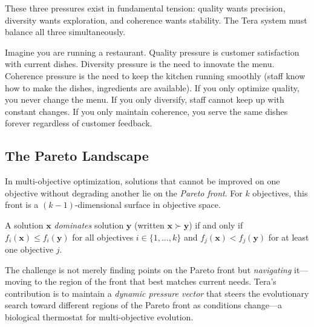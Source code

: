 These three pressures exist in fundamental tension: quality wants precision, diversity wants exploration, and coherence wants stability. The Tera system must balance all three simultaneously.

\begin{example}
\label{ex:restaurant}
Imagine you are running a restaurant. Quality pressure is customer satisfaction with current dishes. Diversity pressure is the need to innovate the menu. Coherence pressure is the need to keep the kitchen running smoothly (staff know how to make the dishes, ingredients are available). If you only optimize quality, you never change the menu. If you only diversify, staff cannot keep up with constant changes. If you only maintain coherence, you serve the same dishes forever regardless of customer feedback.
\end{example}

\subsection{The Pareto Landscape}

In multi-objective optimization, solutions that cannot be improved on one objective without degrading another lie on the \emph{Pareto front}. For $k$ objectives, this front is a $(k-1)$-dimensional surface in objective space.

\begin{definition}
A solution $\mathbf{x}$ \emph{dominates} solution $\mathbf{y}$ (written $\mathbf{x} \succ \mathbf{y}$) if and only if $f_i(\mathbf{x}) \leq f_i(\mathbf{y})$ for all objectives $i \in \{1, \ldots, k\}$ and $f_j(\mathbf{x}) < f_j(\mathbf{y})$ for at least one objective $j$.
\end{definition}

The challenge is not merely finding points on the Pareto front but \emph{navigating} it---moving to the region of the front that best matches current needs. Tera's contribution is to maintain a \emph{dynamic pressure vector} that steers the evolutionary search toward different regions of the Pareto front as conditions change---a biological thermostat for multi-objective evolution.

